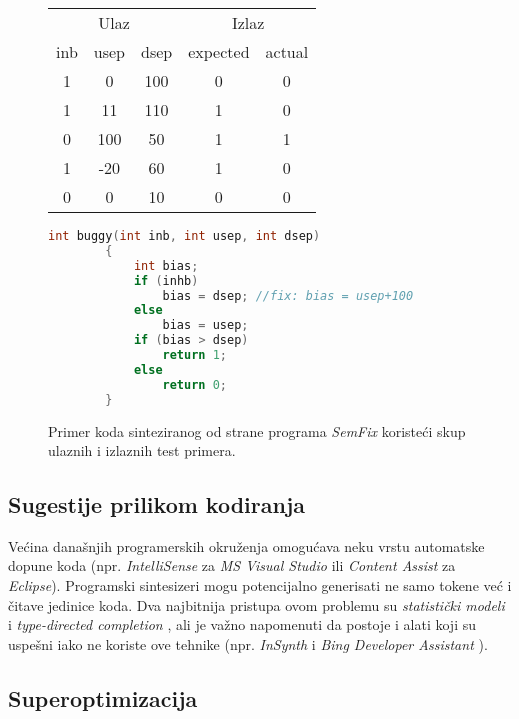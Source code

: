 \begin{figure}[t]
    \centering
    \begin{tabular}{ccc|cc}
        \multicolumn{3}{c|}{Ulaz} & \multicolumn{2}{c}{Izlaz}\\
        inb & usep & dsep & expected & actual \\
        \hline
        1 & 0 & 100 & 0 & 0 \\
        1 & 11 & 110 & 1 & 0 \\
        0 & 100 & 50 & 1 & 1 \\
        1 & -20 & 60 & 1 & 0 \\
        0 & 0 & 10 & 0 & 0 \\
    \end{tabular}

    \centering
    \begin{lstlisting}[language=C]
        int buggy(int inb, int usep, int dsep)
        {
            int bias;
            if (inhb)
                bias = dsep; //fix: bias = usep+100
            else
                bias = usep;
            if (bias > dsep)
                return 1;
            else
                return 0;
        }
    \end{lstlisting}

    \caption{Primer koda sinteziranog od strane programa \emph{SemFix} \cite{SemFix} koristeći skup ulaznih i izlaznih test primera.}
    \label{fig:CodeRepair}
\end{figure}

\subsection{Sugestije prilikom kodiranja}
\label{subsec:SugestijePrilikomKodiranja}

Većina današnjih programerskih okruženja omogućava neku vrstu a\-u\-to\-ma\-tske dopune koda (npr. \emph{IntelliSense} za \emph{MS Visual Studio} ili \emph{Content Assist} za \emph{Eclipse}). Programski sintesizeri mogu potencijalno generisati ne samo tokene već i čitave jedinice koda. Dva najbitnija pristupa ovom problemu su \emph{statistički modeli} \cite{CCWSLM} i \emph{type-directed completion} \cite{TDCOPE}, ali je važno napomenuti da postoje i alati koji su uspešni iako ne koriste ove tehnike (npr. \emph{InSynth} \cite{IS} i \emph{Bing Developer Assistant} \cite{BDA}).


\subsection{Superoptimizacija}
\label{subsec:Superoptimizacija}

